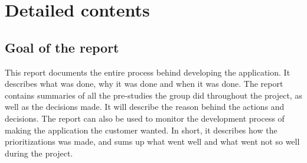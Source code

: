 \chapter*{Detailed contents}

\section*{Goal of the report}
This report documents the entire process behind developing the application. It describes what was done, why it was done and when it was done. The report contains summaries of all the pre-studies the group did throughout the project, as well as the decisions made. It will describe the reason behind the actions and decisions. The report can also be used to monitor the development process of making the application the customer wanted. In short, it describes how the prioritizations was made, and sums up what went well and what went not so well during the project.

